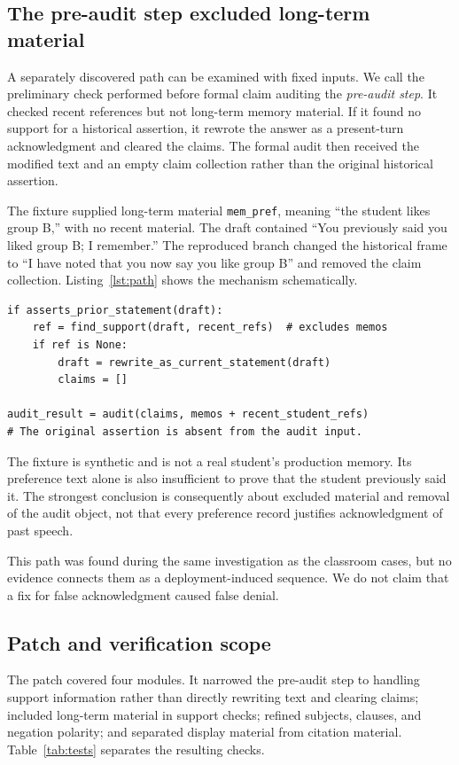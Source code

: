 \documentclass[11pt,a4paper]{article}
\begin{document}
\subsection{The pre-audit step excluded long-term material}
A separately discovered path can be examined with fixed inputs. We call the preliminary check performed before formal claim auditing the \emph{pre-audit step}. It checked recent references but not long-term memory material. If it found no support for a historical assertion, it rewrote the answer as a present-turn acknowledgment and cleared the claims. The formal audit then received the modified text and an empty claim collection rather than the original historical assertion.

The fixture supplied long-term material \texttt{mem\_pref}, meaning ``the student likes group B,'' with no recent material. The draft contained ``You previously said you liked group B; I remember.'' The reproduced branch changed the historical frame to ``I have noted that you now say you like group B'' and removed the claim collection. Listing~\ref{lst:path} shows the mechanism schematically.

\begin{lstlisting}[caption={Schematic vulnerable path, not a full production implementation.},label={lst:path}]
if asserts_prior_statement(draft):
    ref = find_support(draft, recent_refs)  # excludes memos
    if ref is None:
        draft = rewrite_as_current_statement(draft)
        claims = []

audit_result = audit(claims, memos + recent_student_refs)
# The original assertion is absent from the audit input.
\end{lstlisting}

The fixture is synthetic and is not a real student's production memory. Its preference text alone is also insufficient to prove that the student previously said it. The strongest conclusion is consequently about excluded material and removal of the audit object, not that every preference record justifies acknowledgment of past speech.

This path was found during the same investigation as the classroom cases, but no evidence connects them as a deployment-induced sequence. We do not claim that a fix for false acknowledgment caused false denial.

\subsection{Patch and verification scope}
The patch covered four modules. It narrowed the pre-audit step to handling support information rather than directly rewriting text and clearing claims; included long-term material in support checks; refined subjects, clauses, and negation polarity; and separated display material from citation material. Table~\ref{tab:tests} separates the resulting checks.
\end{document}
